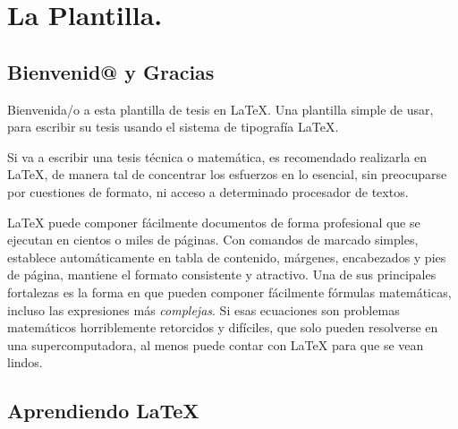 %

\chapter{La Plantilla.} %

\label{Cap_Plantilla} %



\section{Bienvenid@ y Gracias}
Bienvenida/o a esta plantilla de tesis en \LaTeX{}. Una plantilla simple de usar, para escribir su tesis usando el sistema de tipografía \LaTeX. 

Si va a escribir una tesis técnica o matemática, es recomendado realizarla en \LaTeX{}, de manera tal de concentrar los esfuerzos en lo esencial, sin preocuparse por cuestiones de formato, ni acceso a determinado procesador de textos.

\LaTeX{} puede componer fácilmente documentos de forma profesional que se ejecutan en cientos o miles de páginas. Con comandos de marcado simples, establece automáticamente en tabla de contenido,  márgenes, encabezados y pies de página, mantiene el formato consistente y atractivo. Una de sus principales fortalezas es la forma en que pueden componer fácilmente  fórmulas  matemáticas, incluso las expresiones más \emph{complejas}. Si esas ecuaciones son  problemas matemáticos  horriblemente retorcidos y difíciles, que solo pueden resolverse en una supercomputadora, al menos puede contar con \LaTeX{} para que se vean lindos.


\section{Aprendiendo \LaTeX{}}

